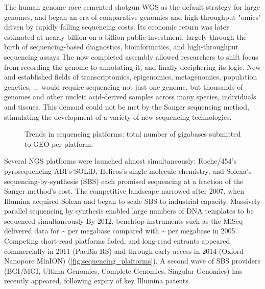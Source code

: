 The human genome race cemented shotgun WGS as the default strategy for large genomes, and began an era of comparative genomics and high-throughput "omics" driven by rapidly falling sequencing costs. Its economic return was later estimated at nearly  billion on a  billion public investment, largely through the birth of sequencing-based diagnostics, bioinformatics, and high-throughput sequencing assays The now completed assembly allowed researchers to shift focus from recording the genome to annotating it, and finally deciphering its logic. New and established fields of transcriptomics, epigenomics, metagenomics, population genetics, ... would require sequencing not just one genome, but thousands of genomes and other nucleic acid-derived samples across many species, individuals and tissues. This demand could not be met by the Sanger sequencing method, stimulating the development of a variety of new sequencing technologies.

\begin{figure}[ht]
	\centering
	
	\caption[Trends in sequencing platforms]{Trends in sequencing platforms: total number of gigabases submitted to GEO per platform.}
	\label{fig:sequencing_plaftorms}
\end{figure}

Several NGS platforms were launched almost simultaneously: Roche/454's pyrosequencing ABI's SOLiD, Helicos's single-molecule chemistry, and Solexa's sequencing-by-synthesis (SBS) each promised sequencing at a fraction of the Sanger method's cost. The competitive landscape narrowed after 2007, when Illumina acquired Solexa and began to scale SBS to industrial capacity. Massively parallel sequencing by synthesis enabled large numbers of DNA templates to be sequenced simultaneously By 2012, benchtop instruments such as the MiSeq delivered data for \textasciitilde{} per megabase compared with \textasciitilde{} per megabase in 2005 Competing short-read platforms faded, and long-read entrants appeared commercially in 2011 (PacBio RS) and through early access in 2014 (Oxford Nanopore MinION) (\autoref{fig:sequencing_plaftorms}). A second wave of SBS providers (BGI/MGI, Ultima Genomics, Complete Genomics, Singular Genomics) has recently appeared, following expiry of key Illumina patents.

